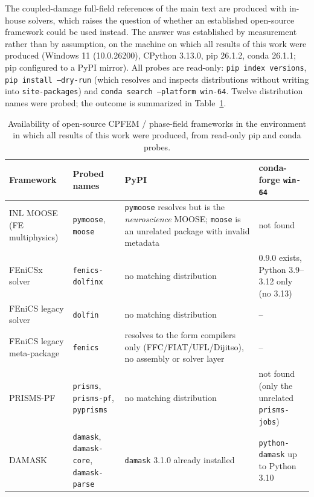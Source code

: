 \documentclass[11pt,a4paper,twocolumn]{article}
\begin{document}
The coupled-damage full-field references of the main text are produced with in-house solvers, which
raises the question of whether an established open-source framework could be used instead. The answer
was established by measurement rather than by assumption, on the machine on which all results of this
work were produced (Windows 11 (10.0.26200), CPython 3.13.0, pip 26.1.2, conda 26.1.1; pip configured
to a PyPI mirror). All probes are read-only: \texttt{pip index versions}, \texttt{pip install --dry-run}
(which resolves and inspects distributions without writing into \texttt{site-packages}) and
\texttt{conda search --platform win-64}. Twelve distribution names were probed; the outcome is
summarized in Table~\ref{tab:framework_availability}.

\begin{table}[htbp]
\centering
\caption{Availability of open-source CPFEM / phase-field frameworks in the environment in which all
results of this work were produced, from read-only pip and conda probes.}
\label{tab:framework_availability}
\footnotesize
\setlength{\tabcolsep}{4pt}
\begin{tabular}{p{}p{}p{}p{}}
\toprule
\textbf{Framework} & \textbf{Probed names} & \textbf{PyPI} & \textbf{conda-forge \texttt{win-64}} \\
\midrule
INL MOOSE (FE multiphysics) & \texttt{pymoose}, \texttt{moose} & \texttt{pymoose} resolves but is the \emph{neuroscience} MOOSE; \texttt{moose} is an unrelated package with invalid metadata & not found \\
FEniCSx solver & \texttt{fenics-dolfinx} & no matching distribution & 0.9.0 exists, Python 3.9--3.12 only (no 3.13) \\
FEniCS legacy solver & \texttt{dolfin} & no matching distribution & -- \\
FEniCS legacy meta-package & \texttt{fenics} & resolves to the form compilers only (FFC/FIAT/UFL/Dijitso), no assembly or solver layer & -- \\
PRISMS-PF & \texttt{prisms}, \texttt{prisms-pf}, \texttt{pyprisms} & no matching distribution & not found (only the unrelated \texttt{prisms-jobs}) \\
DAMASK & \texttt{damask}, \texttt{damask-core}, \texttt{damask-parse} & \texttt{damask} 3.1.0 already installed & \texttt{python-damask} up to Python 3.10 \\
\bottomrule
\end{tabular}
\end{table}
\end{document}
